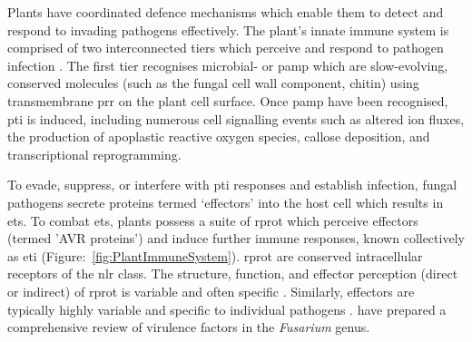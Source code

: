 Plants have coordinated defence mechanisms which enable them to detect and respond to invading pathogens effectively. The plant’s innate immune system is comprised of two interconnected tiers which perceive and respond to pathogen infection \parencite{Jones2006, Han2019, DeFalco2021}. The first tier recognises microbial- or \ac{pamp} which are slow-evolving, conserved molecules (such as the fungal cell wall component, chitin) using transmembrane \ac{prr} on the plant cell surface. Once \ac{pamp} have been recognised, \ac{pti} is induced, including numerous cell signalling events such as altered ion fluxes, the production of apoplastic reactive oxygen species, callose deposition, and transcriptional reprogramming. 

To evade, suppress, or interfere with \ac{pti} responses and establish infection, fungal pathogens secrete proteins termed ‘effectors’ into the host cell which results in \ac{ets}. To combat \ac{ets}, plants possess a suite of \ac{rprot} which perceive effectors (termed '\ac{AVR} proteins') and induce further immune responses, known collectively as \ac{eti} \parencite{Jones2006} (Figure:~\ref{fig:PlantImmuneSystem}). \Ac{rprot} are conserved intracellular receptors of the \ac{nlr} class. The structure, function, and effector perception (direct or indirect) of \ac{rprot} is variable and often specific  \parencite{Chen2022, Wang2022}. Similarly, effectors are typically highly variable and specific to individual pathogens \parencite{LoPresti2015}. \textcite{Gutierrez2023} have prepared a comprehensive review of virulence factors in the \textit{Fusarium} genus. 

